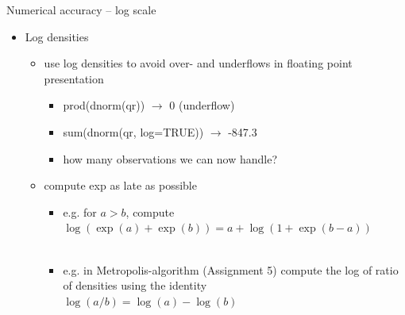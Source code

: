 \documentclass[english,t]{beamer}
\begin{document}
\begin{frame}{Numerical accuracy -- log scale}

  \begin{itemize}
  \item Log densities
    \begin{itemize}
    \item use log densities to avoid over- and underflows in floating
      point presentation
      \begin{itemize}
      \item {\color{navyblue} prod(dnorm(qr)) $\rightarrow$} {\color{red} 0 (underflow)}
      \item {\color{navyblue} sum(dnorm(qr, log=TRUE)) $\rightarrow$} {\color{darkgreen} -847.3}
      \item<2-> how many observations we can now handle? %
    \end{itemize}
    \item<3-> compute exp as late as possible
      \begin{itemize}
      \item<4-> e.g. for $a>b$, compute $\log(\exp(a)+\exp(b)) = a + \log(1+\exp(b-a))$\\
        \\
      \item<7-> e.g. in Metropolis-algorithm (Assignment 5) compute the log of ratio of densities using the identity\\
        $\log(a/b)=\log(a)-\log(b)$
    \end{itemize}
    \end{itemize}
  \end{itemize}

\end{frame}
\end{document}

